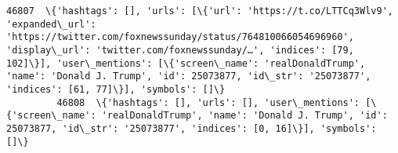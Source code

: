 \documentclass[11pt]{article}
\begin{document}
\begin{Verbatim}[commandchars=\\\{\}]
         46807  \{'hashtags': [], 'urls': [\{'url': 'https://t.co/LTTCq3Wlv9', 'expanded\_url': 'https://twitter.com/foxnewssunday/status/764810066054696960', 'display\_url': 'twitter.com/foxnewssunday/…', 'indices': [79, 102]\}], 'user\_mentions': [\{'screen\_name': 'realDonaldTrump', 'name': 'Donald J. Trump', 'id': 25073877, 'id\_str': '25073877', 'indices': [61, 77]\}], 'symbols': []\}                                                                                                                                                                                                                                                                                                                                                                                                                                                                                                                                                                                                                                                                                                                                                                                                                                  
         46808  \{'hashtags': [], 'urls': [], 'user\_mentions': [\{'screen\_name': 'realDonaldTrump', 'name': 'Donald J. Trump', 'id': 25073877, 'id\_str': '25073877', 'indices': [0, 16]\}], 'symbols': []\}                                                                                                                                                                                                                                                                                                                                                                                                                                                                                                                                                                                                                                                                                                                                                                                                                                                                                                                                                                                                                        

\end{Verbatim}
\end{document}
